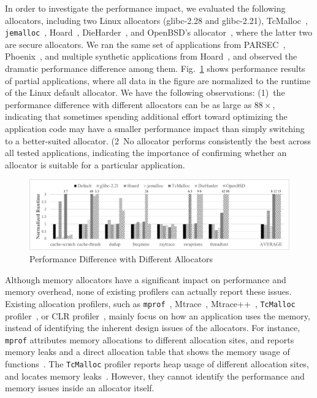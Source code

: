 In order to investigate the performance impact, we evaluated the following allocators, including two Linux allocators (glibc-2.28 and glibc-2.21), TcMalloc~\citep{tcmalloc}, \texttt{jemalloc}~\citep{jemalloc}, Hoard~\citep{Hoard}, DieHarder~\citep{DieHarder}, and OpenBSD's allocator~\citep{openbsd}, where the latter two are secure allocators. We ran the same set of applications from PARSEC~\citep{parsec}, Phoenix~\citep{phoenix}, and multiple synthetic applications from Hoard~\cite{Hoard}, and observed the dramatic performance difference among them. Fig.~\ref{fig:motivation} shows performance results of partial applications, where all data in the figure are normalized to the runtime of the Linux default allocator. We have the following observations: (1)~the performance difference with different allocators can be as large as $88\times$, indicating that sometimes spending additional effort toward optimizing the application code may have a smaller performance impact than simply switching to a better-suited allocator. (2~No allocator performs consistently the best across all tested applications, indicating the importance of confirming whether an allocator is suitable for a particular application. 



\begin{figure}[!ht]
\centering
\includegraphics[width=\columnwidth]{figures/regular-performance}
\caption{Performance Difference with Different Allocators\label{fig:motivation}}
\end{figure}


Although memory allocators have a significant impact on performance and memory overhead, none of existing profilers can actually report these issues. Existing allocation profilers, such as \texttt{mprof}~\citep{Zorn:1988:MAP:894814}, Mtrace~\citep{mtrace}, Mtrace++~\citep{Lee:2000:DMM:786772.787150}, \texttt{TcMalloc} profiler~\citep{tcmalloc-profiler}, or CLR profiler~\citep{lupasc2014dynamic}, mainly focus on how an application uses the memory, instead of identifying the inherent design issues of the allocators. For instance, \texttt{mprof} attributes memory allocations to different allocation sites, and reports memory leaks and a direct allocation table that shows the memory usage of functions~\citep{Zorn:1988:MAP:894814}. The \texttt{TcMalloc} profiler reports heap usage of different allocation sites, and locates memory leaks~\citep{tcmalloc-profiler}. However, they cannot identify the performance and memory issues inside an allocator itself. 

